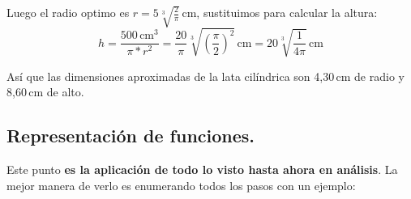 \documentclass[a4paper,11pt,answers]{exam}
\begin{document}
\begin{questions}
\begin{questions}
\begin{solution}
Luego el radio optimo es $r = 5\sqrt[3]{\frac{2}{\pi}}\,\mathrm{cm}$, sustituimos para calcular la altura:
\[h = \frac{500\,\mathrm{cm}^3}{\pi * r^2} = \frac{20}{\pi} \sqrt[3]{\left(\frac{\pi}{2}\right)^2}\,\mathrm{cm} = 20 \sqrt[3]{\frac{1}{4\pi}}\,\mathrm{cm}\]

Así que las dimensiones aproximadas de la lata cilíndrica son 4,30\,cm de radio y 8,60\,cm de alto.
\end{solution}
\end{questions}
\end{questions}

\subsection{Representación de funciones.}
Este punto \textbf{es la aplicación de todo lo visto hasta ahora en análisis}. La mejor manera de verlo es enumerando todos los pasos con un ejemplo:\\
\end{document}
